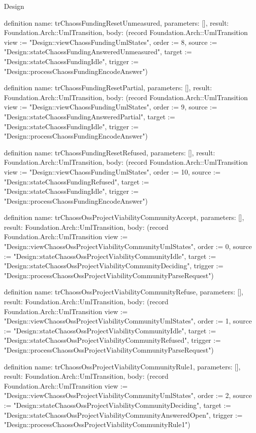 \begin{lexlean}{Design}
\begin{semanticmodule}
definition{
  name: trChaossFundingResetUnmeasured,
  parameters: [],
  result: Foundation.Arch::UmlTransition,
  body: (record Foundation.Arch::UmlTransition {view := "Design::viewChaossFundingUmlStates", order := 8, source := "Design::stateChaossFundingAnsweredUnmeasured", target := "Design::stateChaossFundingIdle", trigger := "Design::processChaossFundingEncodeAnswer"})
}

definition{
  name: trChaossFundingResetPartial,
  parameters: [],
  result: Foundation.Arch::UmlTransition,
  body: (record Foundation.Arch::UmlTransition {view := "Design::viewChaossFundingUmlStates", order := 9, source := "Design::stateChaossFundingAnsweredPartial", target := "Design::stateChaossFundingIdle", trigger := "Design::processChaossFundingEncodeAnswer"})
}

definition{
  name: trChaossFundingResetRefused,
  parameters: [],
  result: Foundation.Arch::UmlTransition,
  body: (record Foundation.Arch::UmlTransition {view := "Design::viewChaossFundingUmlStates", order := 10, source := "Design::stateChaossFundingRefused", target := "Design::stateChaossFundingIdle", trigger := "Design::processChaossFundingEncodeAnswer"})
}

definition{
  name: trChaossOssProjectViabilityCommunityAccept,
  parameters: [],
  result: Foundation.Arch::UmlTransition,
  body: (record Foundation.Arch::UmlTransition {view := "Design::viewChaossOssProjectViabilityCommunityUmlStates", order := 0, source := "Design::stateChaossOssProjectViabilityCommunityIdle", target := "Design::stateChaossOssProjectViabilityCommunityDeciding", trigger := "Design::processChaossOssProjectViabilityCommunityParseRequest"})
}

definition{
  name: trChaossOssProjectViabilityCommunityRefuse,
  parameters: [],
  result: Foundation.Arch::UmlTransition,
  body: (record Foundation.Arch::UmlTransition {view := "Design::viewChaossOssProjectViabilityCommunityUmlStates", order := 1, source := "Design::stateChaossOssProjectViabilityCommunityIdle", target := "Design::stateChaossOssProjectViabilityCommunityRefused", trigger := "Design::processChaossOssProjectViabilityCommunityParseRequest"})
}

definition{
  name: trChaossOssProjectViabilityCommunityRule1,
  parameters: [],
  result: Foundation.Arch::UmlTransition,
  body: (record Foundation.Arch::UmlTransition {view := "Design::viewChaossOssProjectViabilityCommunityUmlStates", order := 2, source := "Design::stateChaossOssProjectViabilityCommunityDeciding", target := "Design::stateChaossOssProjectViabilityCommunityAnsweredOpen", trigger := "Design::processChaossOssProjectViabilityCommunityRule1"})
}


\end{semanticmodule}
\end{lexlean}
